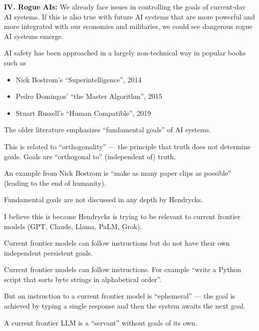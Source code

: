 {\vfill
{\bf IV. Rogue AIs:} We already face issues in controlling the goals of current-day AI systems. If this is also true with future AI systems that are more powerful and more integrated with our economies and militaries, we could see dangerous rogue AI systems emerge.


AI safety has been approached in a largely non-technical way in popular books such as

\vfill
\begin{itemize}
\item Nick Bostrom's ``Superintelligence'', 2014

\vfill
\item Pedro Domingos' ``the Master Algorithm'', 2015

\vfill
\item Stuart Russell's ``Human Compatible'', 2019
\end{itemize}


The older literature emphasizes  ``fundamental goals'' of AI systems.

\vfill
This is related to ``orthogonality'' --- the principle that truth
does not determine goals.  Goals are ``orthogonal to'' (independent of) truth.

\vfill
An example from Nick Bostrom is ``make as many paper clips as possible'' (leading to the end of humanity).


Fundamental goals are not discussed in any depth by Hendrycks.

\vfill
I believe this is because Hendrycks is trying to be relevant to current frontier models (GPT, Claude, Llama, PaLM, Grok).

\vfill
Current frontier models can follow instructions but do not have their own independent persistent goals.


Current frontier models can follow instructions. For example ``write a Python script that sorts byte strings in alphabetical order''.

\vfill
But an instruction to a current frontier model is ``ephemeral'' --- the goal is achieved by typing a single response and then the system awaits the next goal.

\vfill
A current frontier LLM is a ``servant'' without goals of its own.

}
